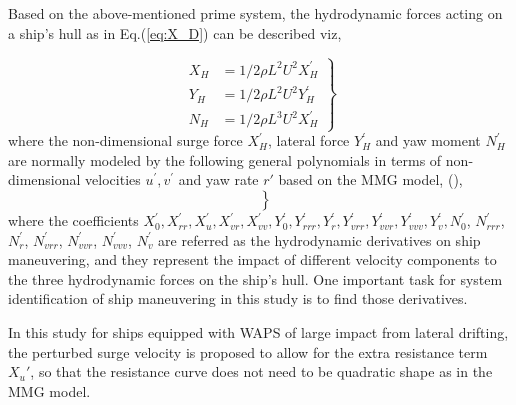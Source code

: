 \noindent Based on the above-mentioned prime system, the hydrodynamic forces acting on a ship's hull as in Eq.(\ref{eq:X_D}) can be described viz,

\begin{equation}
    \label{eq:XYN_H}
    \left.\begin{aligned}
    X_H & = 1/2\rho L^{2} U^{2} X_H^{'}  \\
    Y_H & = 1/2\rho L^{2} U^{2} Y_H^{'}  \\
    N_H & = 1/2\rho L^{3} U^{2} X_H^{'}
    \end{aligned}\right\}
\end{equation}
where the non-dimensional surge force $X_H^{'}$, lateral force $Y_H^{'}$ and yaw moment $N_H^{'}$ are normally modeled by the following general polynomials in terms of non-dimensional velocities $u^{'}, v^{'}$ and yaw rate $r'$ based on the MMG model, (\citep{yasukawaIntroductionMMGStandard2015}),
\begin{equation}
    \label{eq:XYN_H_prime}
    \left.\begin{aligned}
     \\
     \\
    
    \end{aligned}\right\}
\end{equation}
where the coefficients $X_0^{'}, X_{rr}^{'}, X_u^{'}, X_{vr}^{'}, X_{vv}^{'}, Y_{0}^{'}, Y_{rrr}^{'}, Y_{r}^{'}, Y_{vrr}^{'}, Y_{vvr}^{'}, Y_{vvv}^{'}, Y_{v}^{'}, N_{0}^{'}$, $N_{rrr}^{'}$, $N_{r}^{'}$, $N_{vrr}^{'}$, $N_{vvr}^{'}$, $N_{vvv}^{'}$, $N_{v}^{'}$ are referred as the hydrodynamic derivatives on ship maneuvering, and they represent the impact of different velocity components to the three hydrodynamic forces on the ship's hull. One important task for system identification of ship maneuvering in this study is to find those derivatives.

In this study for ships equipped with WAPS of large impact from lateral drifting, the perturbed surge velocity is proposed to allow for the extra resistance term ${X_u}'$, so that the resistance curve does not need to be quadratic shape as in the MMG model.  
%
%     
%     
